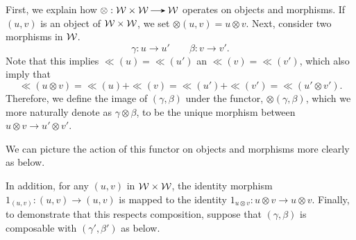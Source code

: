 \begin{prf}
    First, we explain how $\otimes: \ww \times \ww \to \ww$ operates on objects 
    and morphisms.
    If $(u, v)$ is an object of $\mathcal{W} \times \mathcal{W}$, we set $\otimes(u, v) = u \otimes v$. 
    Next, consider two morphisms in $\mathcal{W}$.
    \[
        \gamma: u \to u' \qquad \beta: v \to v'.
    \]
    Note that this implies $\ll(u) = \ll(u')$ an $\ll(v) = \ll(v')$, which 
    also imply that 
    \[
        \ll(u \otimes v) = \ll(u) + \ll(v) = \ll(u') + \ll(v') = \ll(u' \otimes v').
    \]
    Therefore, we define the image of $(\gamma, \beta)$ under the functor, $\otimes(\gamma, \beta)$, which we more naturally denote 
    as $\gamma\otimes \beta$, to be the unique morphism between $u \otimes v \to u' \otimes v'$.

    We can picture the action of this functor on objects and morphisms more clearly as below.
    \begin{center}
        \raisebox{0.5cm}{maps to}
    \end{center}
    In addition, for any $(u,v)$ in $\mathcal{W}\times\mathcal{W}$, the identity morphism $1_{(u,v)}: (u,v) \to (u,v)$ 
    is mapped to the identity $1_{u\otimes v} :u \otimes v \to u \otimes v$. 
    Finally, to demonstrate that this respects composition, suppose that 
    $(\gamma, \beta)$ is composable with $(\gamma', \beta')$
    as below.
    \begin{center}

\end{center}
\end{prf}
